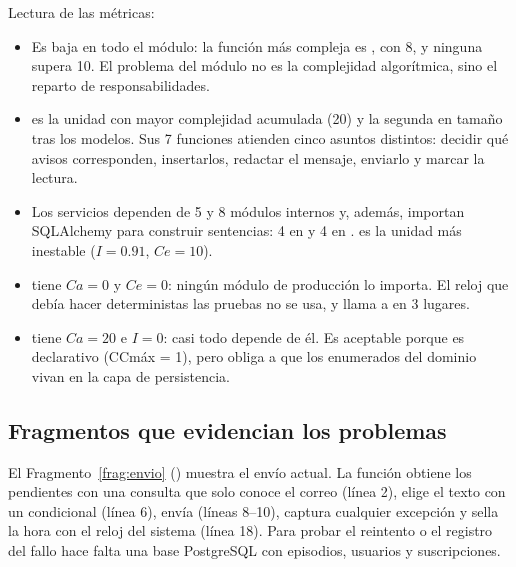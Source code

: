 \documentclass[11pt,a4paper]{article}
\begin{document}
Lectura de las métricas:
\begin{itemize}
  \item {} Es baja en todo el módulo: la función más compleja es , con 8, y ninguna supera 10. El problema del módulo no es la complejidad algorítmica, sino el reparto de responsabilidades.
  \item {}  es la unidad con mayor complejidad acumulada (20) y la segunda en tamaño tras los modelos. Sus 7 funciones atienden cinco asuntos distintos: decidir qué avisos corresponden, insertarlos, redactar el mensaje, enviarlo y marcar la lectura.
  \item {} Los servicios dependen de 5 y 8 módulos internos y, además, importan SQLAlchemy para construir sentencias: 4 en  y 4 en .  es la unidad más inestable ($I = 0.91$, $Ce = 10$).
  \item {}  tiene $Ca = 0$ y $Ce = 0$: ningún módulo de producción lo importa. El reloj que debía hacer deterministas las pruebas no se usa, y  llama a  en 3 lugares.
  \item {}  tiene $Ca = 20$ e $I = 0$: casi todo depende de él. Es aceptable porque es declarativo (CCmáx = 1), pero obliga a que los enumerados del dominio vivan en la capa de persistencia.
\end{itemize}

\subsection{Fragmentos que evidencian los problemas}

El Fragmento~\ref{frag:envio} () muestra el envío actual. La función obtiene los pendientes con una consulta que solo conoce el correo (línea 2), elige el texto con un condicional (línea 6), envía (líneas 8--10), captura cualquier excepción y sella la hora con el reloj del sistema (línea 18). Para probar el reintento o el registro del fallo hace falta una base PostgreSQL con episodios, usuarios y suscripciones.
\end{document}
